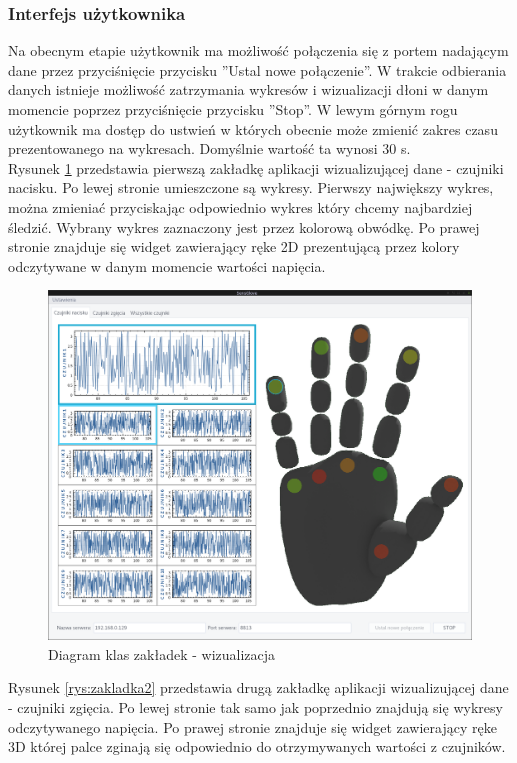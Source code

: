 ﻿\documentclass{article}
\begin{document}
\subsubsection{Interfejs użytkownika}
Na obecnym etapie użytkownik ma możliwość połączenia się z portem nadającym dane przez przyciśnięcie przycisku ''Ustal nowe połączenie''. W trakcie odbierania danych istnieje możliwość zatrzymania wykresów i wizualizacji dłoni w danym momencie poprzez przyciśnięcie przycisku ''Stop''. W lewym górnym rogu użytkownik ma dostęp do ustwień w których obecnie może zmienić zakres czasu prezentowanego na wykresach. Domyślnie wartość ta wynosi 30 s.\\
Rysunek \ref{rys:zakladka1} przedstawia pierwszą zakładkę aplikacji wizualizującej dane - czujniki nacisku. Po lewej stronie umieszczone są wykresy. Pierwszy największy wykres, można zmieniać przyciskając odpowiednio wykres który chcemy najbardziej śledzić. Wybrany wykres zaznaczony jest przez kolorową obwódkę. Po prawej stronie znajduje się widget zawierający ręke 2D prezentującą przez kolory odczytywane w danym momencie wartości napięcia.
\begin{figure}[H]
    \centering
    \includegraphics[width=18cm]{zakladka1.png}
    \caption{Diagram klas zakładek - wizualizacja}
    \label{rys:zakladka1}
\end{figure}
Rysunek \ref{rys:zakladka2} przedstawia drugą zakładkę aplikacji wizualizującej dane - czujniki zgięcia. Po lewej stronie tak samo jak poprzednio znajdują się wykresy odczytywanego napięcia. Po prawej stronie znajduje się widget zawierający ręke 3D której palce zginają się odpowiednio do otrzymywanych wartości z czujników.
\end{document}
